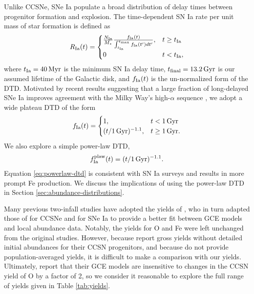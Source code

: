 \documentclass[twocolumn,twocolappendix,linenumbers]{aastex631}
\begin{document}
Unlike CCSNe, SNe Ia populate a broad distribution of delay times between progenitor formation and explosion. The time-dependent SN Ia rate per unit mass of star formation is defined as
\begin{equation}
    R_{\rm Ia}(t) = 
    \begin{cases}
        \frac{N_{\rm Ia}}{M_\star}
        \frac{f_{\rm Ia}(t)}{\int_{t_{\rm Ia}}^{t_{\rm max}} f_{\rm Ia}(t') dt'}, & t \ge t_{\rm Ia} \\
        0 & t < t_{\rm Ia},
    \end{cases}
    \label{eq:dtd-function}
\end{equation}
where $t_{\rm Ia}=40\,{\rm Myr}$ is the minimum SN Ia delay time, $t_{\rm final}=13.2\,{\rm Gyr}$ is our assumed lifetime of the Galactic disk, and $f_{\rm Ia}(t)$ is the un-normalized form of the DTD. Motivated by recent results suggesting that a large fraction of long-delayed SNe Ia improves agreement with the Milky Way's high-$\alpha$ sequence \citep{palicio_analytic_2023,dubay_galactic_2024}, we adopt a wide plateau DTD of the form
\begin{equation}
    \label{eq:plateau-dtd}
    f_{\rm Ia}(t) =
    \begin{cases}
        1, & t < 1\,{\rm Gyr} \\
        (t/1\,{\rm Gyr})^{-1.1}, & t \ge 1\,{\rm Gyr}.
    \end{cases}
\end{equation}
We also explore a simple power-law DTD,
\begin{equation}
    f_{\rm Ia}^{\rm plaw}(t) = (t/1\,\rm{Gyr})^{-1.1}.
    \label{eq:powerlaw-dtd}
\end{equation}
Equation \ref{eq:powerlaw-dtd} is consistent with SN Ia surveys \citep[e.g.,][]{maoz_star_2017} and results in more prompt Fe production.
We discuss the implications of using the power-law DTD in Section \ref{sec:abundance-distributions}.

Many previous two-infall studies have adopted the yields of \citet{francois_evolution_2004}, who in turn adapted those of \citet{woosley_evolution_1995} for CCSNe and \citet{iwamoto_nucleosynthesis_1999} for SNe Ia to provide a better fit between GCE models and local abundance data. Notably, the yields for O and Fe were left unchanged from the original studies. However, because \citet{woosley_evolution_1995} report gross yields without detailed initial abundances for their CCSN progenitors, and because \citet{francois_evolution_2004} do not provide population-averaged yields, it is difficult to make a comparison with our yields. Ultimately, \citet{francois_evolution_2004} report that their GCE models are insensitive to changes in the CCSN yield of O by a factor of 2, so we consider it reasonable to explore the full range of yields given in Table \ref{tab:yields}.
\end{document}
